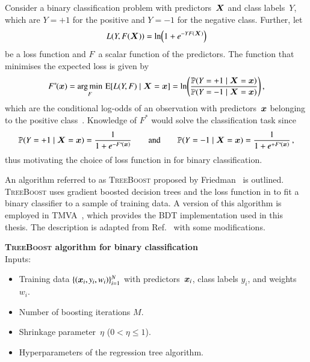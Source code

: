 Consider a binary classification problem with predictors~$\bm{X}$ and class
labels~$Y$, which are $Y = +1$ for the positive and $Y = -1$ for the negative
class.
Further, let
\begin{align}
  L(Y, F(\bm{X})) = \ln\mathopen{}\left(
  1 + e^{-Y F(\bm{X})}
  \right)\mathclose{}
  \label{eq:loss_gradboost}
\end{align}
be a loss function and $F$~a scalar function of the predictors. The function
that minimises the expected loss is given by
\begin{align*}
  F^{*\!}(\bm{x})
  = \operatorname*{arg\,min}_F \, \operatorname{E}[ L(Y, F) \mid \bm{X} = \bm{x} ]
  = \ln\mathopen{}\left(
  \frac{
  \mathbb{P}(Y = +1 \mid \bm{X} = \bm{x})
  }{
  \mathbb{P}(Y = -1 \mid \bm{X} = \bm{x})
  }
  \right)\mathclose{} \,\text{,}
\end{align*}
which are the conditional log-odds of an observation with predictors~$\bm{x}$
belonging to the positive class~\cite{Friedman:2000}. Knowledge of $F^{*\!}$
would solve the classification task since
\begin{align}
  \mathbb{P}(Y = +1 \mid \bm{X} = \bm{x}) = \frac{1}{1 + e^{-F^{*\!}(\bm{x})}}
  \qquad \text{and} \qquad
  \mathbb{P}(Y = -1 \mid \bm{X} = \bm{x}) = \frac{1}{1 + e^{+F^{*\!}(\bm{x})}} \,\text{,}
  \label{eq:gradboost_probas}
\end{align}
thus motivating the choice of loss function in  for
binary classification.

An algorithm referred to as \textsc{TreeBoost} proposed by
Friedman~\cite{Friedman:2001wbq} is outlined. \textsc{TreeBoost} uses gradient
boosted decision trees and the loss function in  to fit
a binary classifier to a sample of training data. A version of this algorithm is
employed in \textsc{TMVA}~\cite{TMVA}, which provides the BDT implementation
used in this thesis. The description is adapted from
Ref.~\cite{Friedman:2001wbq} with some modifications.

\vspace{11pt}
\noindent\textbf{\textsc{TreeBoost} algorithm for binary classification} \\[11pt]
\noindent Inputs:
\begin{itemize}[itemsep=2pt]
\item Training data $\{(\bm{x}_i, y_i, w_i)\}_{i = 1}^{N}$ with
  predictors~$\bm{x}_i$, class labels $y_i$, and weights~$w_i$.
\item Number of boosting iterations $M$.
\item Shrinkage parameter~$\eta$ ($0 < \eta \leq 1$).
\item Hyperparameters of the regression tree algorithm.
\end{itemize}

